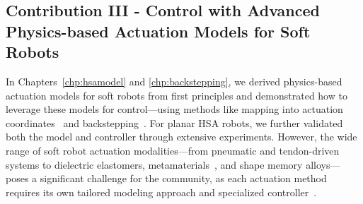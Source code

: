 \subsection{Contribution III - Control with Advanced Physics-based Actuation Models for Soft Robots}
In Chapters~\ref{chp:hsamodel} and \ref{chp:backstepping}, we derived physics-based actuation models for soft robots from first principles and demonstrated how to leverage these models for control—using methods like mapping into actuation coordinates~\citep{pustina2024input} and backstepping~\citep{khalil2002nonlinear}. For planar \gls{HSA} robots, we further validated both the model and controller through extensive experiments. However, the wide range of soft robot actuation modalities—from pneumatic and tendon-driven systems to dielectric elastomers, metamaterials~\citep{zaidi2021actuation}, and shape memory alloys—poses a significant challenge for the community, as each actuation method requires its own tailored modeling approach and specialized controller~\citep{copaci2020flexible, soleti2024nonlinear, soleti2025model}.

